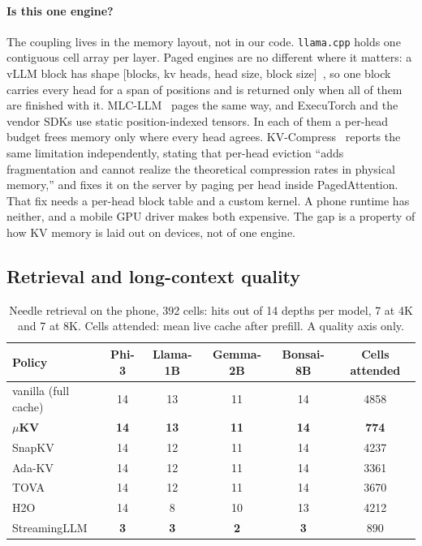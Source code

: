 \documentclass[sigconf, anonymous=false, screen=true]{acmart}
\newcommand{\good}[1]{\textcolor{kvgreen}{\textbf{#1}}}
\newcommand{\bad}[1]{\textcolor{kvred}{\textbf{#1}}}
\newcommand{\muKV}{$\mu$KV}
\begin{document}
\paragraph{Is this one engine?} The coupling lives in the memory layout, not in our code. \texttt{llama.cpp} holds one contiguous cell array per layer. Paged engines are no different where it matters: a vLLM block has shape [blocks, kv heads, head size, block size]~\cite{kwon2023vllm}, so one block carries every head for a span of positions and is returned only when all of them are finished with it. MLC-LLM~\cite{mlcllm} pages the same way, and ExecuTorch and the vendor SDKs use static position-indexed tensors. In each of them a per-head budget frees memory only where every head agrees. KV-Compress~\cite{rehg2024kvcompress} reports the same limitation independently, stating that per-head eviction ``adds fragmentation and cannot realize the theoretical compression rates in physical memory,'' and fixes it on the server by paging per head inside PagedAttention. That fix needs a per-head block table and a custom kernel. A phone runtime has neither, and a mobile GPU driver makes both expensive. The gap is a property of how KV memory is laid out on devices, not of one engine.

\subsection{Retrieval and long-context quality}
\label{sec:eval-quality}

\begin{table}[tb]
\caption{Needle retrieval on the phone, 392 cells: hits out of 14 depths per model, 7 at 4K and 7 at 8K. Cells attended: mean live cache after prefill. A quality axis only.}
\label{tab:niah}
\centering\footnotesize
\setlength{\tabcolsep}{4pt}
\begin{tabular}{l c c c c c}
\toprule
\textbf{Policy} & \textbf{Phi-3} & \textbf{Llama-1B} & \textbf{Gemma-2B} & \textbf{Bonsai-8B} & \textbf{Cells attended} \\
\midrule
vanilla (full cache) & 14 & 13 & 11 & 14 & 4858 \\
\textbf{\muKV}       & \good{14} & \good{13} & \good{11} & \good{14} & \good{774} \\
SnapKV               & 14 & 12 & 11 & 14 & 4237 \\
Ada-KV               & 14 & 12 & 11 & 14 & 3361 \\
TOVA                 & 14 & 12 & 11 & 14 & 3670 \\
H2O                  & 14 & 8 & 10 & 13 & 4212 \\
StreamingLLM         & \bad{3} & \bad{3} & \bad{2} & \bad{3} & 890 \\
\bottomrule
\end{tabular}
\end{table}
\end{document}
